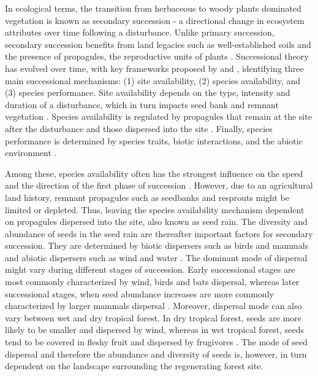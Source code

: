 In ecological terms, the transition from herbaceous to woody plants dominated vegetation is known as secondary succession - a directional change in ecosystem attributes over time following a disturbance. Unlike primary succession, secondary succession benefits from land legacies such as well-established soils and the presence of propagules, the reproductive units of plants \citep{poorterSuccessionalTheories2023}. %
Successional theory has evolved over time, with 
key frameworks proposed by \citet{pickettHierarchicalConsiderationCauses1987} and \citet{poorterComprehensiveFrameworkVegetation2024}, identifying three main successional mechanisms: (1) site availability, (2) species availability, and (3) species performance. Site availability depends on the type, intensity and duration of a disturbance, which in turn impacts seed bank and remnant vegetation \citep{poorterComprehensiveFrameworkVegetation2024}. Species availability is regulated by propagules that remain at the site after the disturbance and those dispersed into the site \citep{gleasonIndividualisticConceptPlant1926, dentUnitingNicheDifferentiation2021}. Finally, species performance is determined by species traits, biotic interactions, and the abiotic environment \citep{poorterComprehensiveFrameworkVegetation2024}. 

Among these, species availability often has the strongest influence on the speed and the direction of the first phase of succession \citep{poorterSuccessionalTheories2023, dentUnitingNicheDifferentiation2021}. However, due to an agricultural land history, remnant propagules such as seedbanks and resprouts might be limited or depleted. Thus, leaving the species availability mechanism dependent on propagules dispersed into the site, also known as seed rain. The diversity and abundance of seeds in the seed rain are thereafter important factors for secondary succession. They are determined by biotic dispersers such as birds and mammals and abiotic dispersers such as wind and water \citep{poorterComprehensiveFrameworkVegetation2024}. The dominant mode of dispersal might vary during different stages of succession. Early successional stages are most commonly characterized by wind, birds and bats dispersal, whereas later successional stages, when seed abundance increases are more commonly characterized by larger mammals dispersal \citep{dentUnitingNicheDifferentiation2021}. Moreover, dispersal mode can also vary between wet and dry tropical forest. In dry tropical forest, seeds are more likely to be smaller and dispersed by wind, whereas in wet tropical forest, seeds tend to be covered in fleshy fruit and dispersed by frugivores \citep{}. 
The mode of seed dispersal and therefore the abundance and diversity of seeds is, however, in turn dependent on the landscape surrounding the regenerating forest site. 


